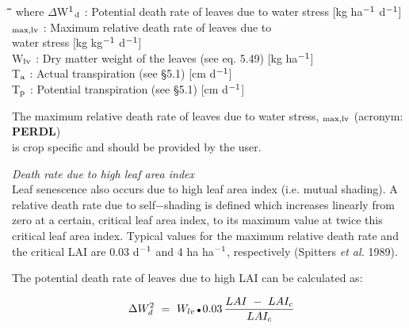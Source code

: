 \nwln
\begin{tabbing}
\hspace{1.27cm}\=\hspace{1.27cm}\=\hspace{1.27cm}\=\hspace{1.27cm}\=%
\hspace{1.27cm}\=\hspace{1.27cm}\=\hspace{1.27cm}\=\hspace{1.27cm}\=%
\hspace{1.27cm}\=\hspace{1.27cm}\=\kill
where $\Delta$W$^{{\rm 1}}$$_{{\rm d}}$ : Potential death rate of leaves due to water stress         [kg  ha$^{{\rm -1}}$ d$^{{\rm -1}}$]\\
\dag $_{{\rm max,lv}}$ : Maximum relative death rate of leaves due to\\
   water stress        [kg kg$^{{\rm -1}}$ d$^{{\rm -1}}$]\\
W$_{{\rm lv}}$ : Dry matter weight of the leaves (see eq. 5.49)        [kg ha$^{{\rm -1}}$]\\
T$_{{\rm a}}$ : Actual transpiration (see \S 5.1)        [cm d$^{{\rm -1}}$]\\
T$_{{\rm p}}$ : Potential transpiration (see \S 5.1)        [cm d$^{{\rm -1}}$]
\end{tabbing}

 
The maximum relative death rate of leaves due to water stress, {\bf \dag $_{{\rm max,lv}}$} (acronym: {\bf PERDL})\\
is crop specific and should be provided by the user.



{\it Death rate due to high leaf area index\/}\\
Leaf senescence also occurs due to high leaf area index (i.e. mutual shading). A relative
death rate due to self$-$shading is defined which increases linear\-ly from zero at a certain,
critical leaf area index, to its maximum value at twice this critical leaf area index. Typical
values for the maximum relative death rate and the critical LAI are 0.03 d$^{{\rm -1}}$ and 4 ha ha$^{{\rm -}{1}}$,
respectively (Spitters {\it et al.\/} 1989).




 The potential death rate of leaves due to high LAI can be calculated as:

\begin{displaymath}
\Delta W _{d}^{2} ~=~ W _{lv} \, {\rm \Bullet{0.75ex}}\, 0.03\,{\frac{ LAI ~-~ LAI _{c} }{LAI _{c} }}
\end{displaymath}

